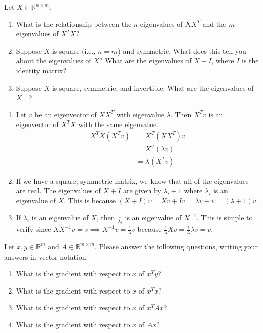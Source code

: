 \documentclass[submit]{harvardml}
\newcommand{\R}{\mathbb{R}}
\begin{document}

\begin{problem}
Let $X \in \R^{n \times m}$.
\begin{enumerate}[label=(\alph*)]
\item What is the relationship between the $n$ eigenvalues of $XX^T$ and the $m$ eigenvalues of $X^TX$?
\item Suppose $X$ is square (i.e., $n=m$) and symmetric. What does this tell you about the eigenvalues of $X$? What are the eigenvalues of $X + I$, where $I$ is the identity matrix?
\item Suppose $X$ is square, symmetric, and invertible. What are the eigenvalues of $X^{-1}$?
\end{enumerate}
\end{problem}

\begin{enumerate}[label=(\alph*)]
\item  Let $v$ be an eigenvector of $XX^T$ with eigenvalue $\lambda$. Then $X^Tv$ is an eigenvector of $X^TX$ with the same eigenvalue.
\begin{align*}
X^TX(X^Tv) &= X^T(XX^T)v \\
&= X^T(\lambda v) \\
&= \lambda(X^Tv)
\end{align*}
\item If we have a square, symmetric matrix, we know that all of the eigenvalues are real. The eigenvalues of $X+I$ are given by $\lambda_i + 1$ where $\lambda_i$ is an eigenvalue of $X$. This is because $(X+I)v = Xv + Iv = \lambda v + v = (\lambda + 1)v$.
\item If $\lambda_i$ is an eigenvalue of $X$, then $\frac{1}{\lambda_i}$ is an eigenvalue of $X^{-1}$. This is simple to verify since $XX^{-1}v = v \implies X^{-1}v = \frac{1}{\lambda}v$ because $\frac{1}{\lambda}Xv = \frac{1}{\lambda}{\lambda}v = v$.
\end{enumerate}


\begin{problem}[Calculus]
Let $x, y \in \R^m$ and $A \in \R^{m \times m}$. Please answer the following questions, writing your answers in vector notation.
\begin{enumerate}[label=(\alph*)]
\item What is the gradient with respect to $x$ of $x^T y$?
\item What is the gradient with respect to $x$ of $x^T x$?
\item What is the gradient with respect to $x$ of $x^T A x$?
\item What is the gradient with respect to $x$ of $A x$?
\end{enumerate}
\end{problem}
\end{document}
